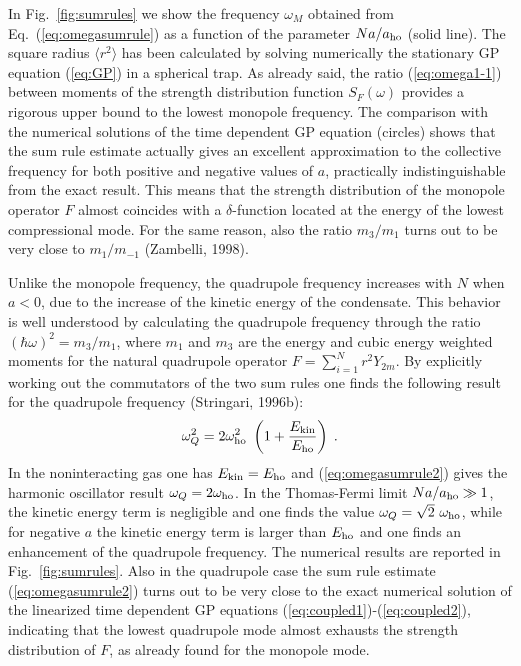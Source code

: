 In Fig.~\ref{fig:sumrules} we show the frequency $\omega_M$ obtained 
from Eq.~(\ref{eq:omegasumrule}) as a 
function of the parameter  $Na/a_{\rm ho}$ (solid line). The square radius 
$\langle r^2 \rangle$ has been calculated  by solving numerically the 
stationary GP equation (\ref{eq:GP}) in a spherical trap. As already said,  
the ratio (\ref{eq:omega1-1}) between moments of the strength distribution 
function $S_F(\omega)$ provides a rigorous upper bound to the lowest 
monopole frequency. The comparison with the numerical solutions of the 
time dependent GP equation (circles) shows that the sum rule estimate 
actually gives an excellent approximation to the collective frequency 
for both positive and negative values of $a$, practically indistinguishable 
from the exact result. This means that the strength distribution of the 
monopole operator $F$ almost coincides with a $\delta$-function located 
at the energy of the lowest compressional mode. For the same reason, 
also the ratio $m_3/m_1$ turns out to be very close to $m_{1}/m_{-1}$
(Zambelli, 1998).

Unlike the monopole frequency, the quadrupole frequency increases with 
$N$ when $a<0$, due to the increase of the kinetic energy of the
condensate. This behavior is well understood by calculating the quadrupole
frequency through the ratio $(\hbar\omega)^2 = m_3/m_1$, where
$m_1$ and $m_3$ are the energy and cubic energy weighted moments for
the natural quadrupole operator $F=\sum_{i=1}^Nr^2 Y_{2m}$.
By explicitly working out the commutators of the two sum rules one finds 
the following result for the quadrupole frequency (Stringari, 1996b):
\begin{equation}
\omega_Q^2 = 2\omega_{\rm ho}^2\ \left( 1 + 
{E_{\rm kin} \over E_{\rm ho}} \right) \; .
\label{eq:omegasumrule2}
\end{equation}
In the noninteracting gas one has $E_{\rm kin}=E_{\rm ho}$ and
(\ref{eq:omegasumrule2})  gives the harmonic oscillator result
$\omega_Q=2\omega_{\rm ho}$. In the Thomas-Fermi limit $Na/a_{\rm ho}
\gg 1$, the kinetic energy term is negligible and one
finds the value $\omega_Q= \sqrt{2} \ \omega_{\rm ho}$, while
for negative $a$ the kinetic energy term  is larger than
$E_{\rm ho}$  and  one finds an enhancement of the quadrupole frequency.
The numerical results are reported in Fig.~\ref{fig:sumrules}.
Also in the quadrupole case the sum rule estimate (\ref{eq:omegasumrule2})
turns out to be very close to the exact numerical solution of the linearized 
time dependent GP equations (\ref{eq:coupled1})-(\ref{eq:coupled2}),
indicating that the lowest quadrupole mode almost exhausts the
strength distribution of $F$, as already found for the monopole mode. 

